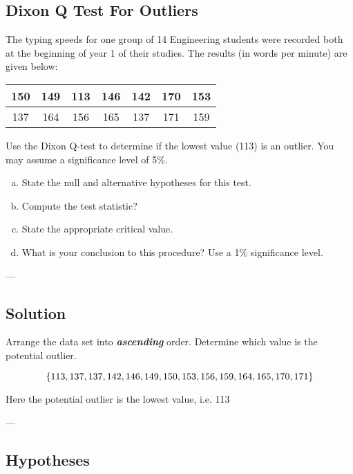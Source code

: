 
\subsection*{Dixon Q Test For Outliers}

The typing speeds for one group of 14 Engineering students were recorded both at the beginning of year 1 of their studies. The results (in words per minute) are given below:

\begin{center}
	\begin{tabular}{|c|c|c|c|c|c|c|}
		\hline
		150 &149 & 113 & 146 & 142 &170& 153\\ \hline
		137 & 164 & 156& 165& 137& 171& 159
		\\ \hline
	\end{tabular}
\end{center}
Use the Dixon Q-test to determine if the lowest value (113) is an outlier. You may assume a significance level of 5\%.

\begin{enumerate}[(a)]
\item  State the null and alternative hypotheses for this test.
\item  Compute the test statistic?
\item  State the appropriate critical value.
\item  What is your conclusion to this procedure? Use a 1\% significance level.
\end{enumerate}


---

\subsection*{Solution}
Arrange the data set into \textbf{\textit{ascending}} order. Determine which value is the potential outlier.

\[\LARGE \{ 113, 137, 137, 142, 146, 149, 150, 153, 156, 159, 164, 165, 
170, 171\} \]

Here the potential outlier is the lowest value, i.e. 113

---

\subsection*{Hypotheses}

